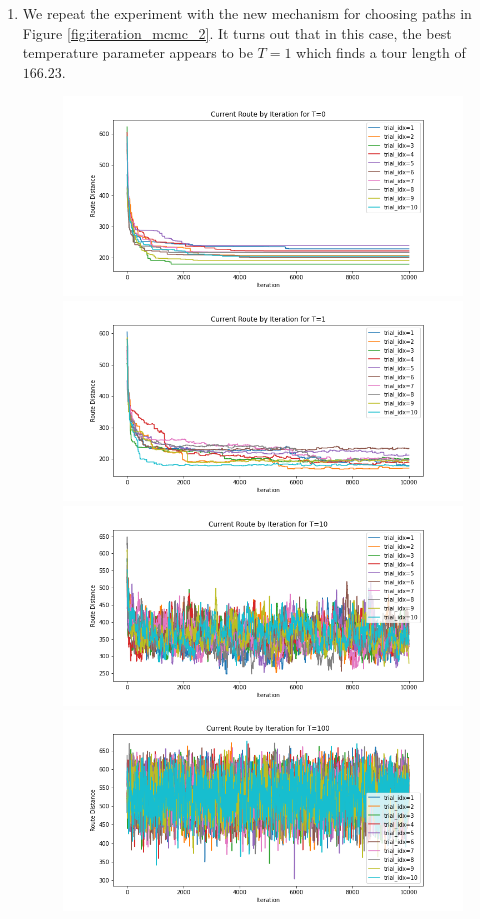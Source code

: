 \documentclass[12pt]{article}
\begin{document}
\begin{enumerate}[label=(\alph*)]
  \item
    We repeat the experiment with the new mechanism for choosing paths in Figure \ref{fig:iteration_mcmc_2}. It turns out that in this case, the best temperature parameter appears to be $T = 1$ which finds a tour length of $166.23$.

    \begin{figure}[!ht]
      \centering
      \includegraphics[scale=0.32]{figures/route_by_iteration_t=0_random.png}
      \includegraphics[scale=0.32]{figures/route_by_iteration_t=1_random.png}
      \includegraphics[scale=0.32]{figures/route_by_iteration_t=10_random.png}
      \includegraphics[scale=0.32]{figures/route_by_iteration_t=100_random.png}

\end{figure}
\end{enumerate}
\end{document}
